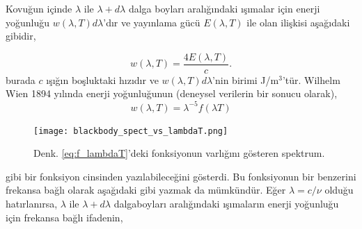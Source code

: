 \documentclass[a4paper,12pt, twoside]{article}
\begin{document}



Kovuğun içinde $\lambda$ ile $\lambda+d\lambda$ dalga boyları aralığındaki ışımalar için enerji yoğunluğu $w(\lambda,T) d\lambda$'dır ve yayınlama gücü $E(\lambda,T)$ ile olan ilişkisi aşağıdaki gibidir,
 
\begin{equation}
\label{eq:emissiveDensity}
w(\lambda,T) = \frac{4 E(\lambda,T)}{c}.
\end{equation}
burada $c$ ışığın boşluktaki hızıdır ve $w(\lambda,T)d\lambda$'nin birimi J/m$^3$'tür. Wilhelm Wien 1894 yılında enerji yoğunluğunun (deneysel verilerin bir sonucu olarak), 
\begin{equation}
\label{eq:f_lambdaT}
w(\lambda,T) = \lambda^{-5} f(\lambda T)
\end{equation}
\begin{figure}[hbtp]
\center
\texttt{[image: blackbody\_spect\_vs\_lambdaT.png]}
\caption{Denk. \ref{eq:f_lambdaT}'deki fonksiyonun varlığını gösteren spektrum.}
\label{fig:karaSpektrum_lamdaT}
\end{figure}
gibi bir fonksiyon cinsinden yazılabileceğini gösterdi. Bu fonksiyonun bir benzerini frekansa bağlı olarak aşağıdaki gibi yazmak da mümkündür. Eğer $\lambda = c/\nu$ olduğu hatırlanırsa, $\lambda$ ile $\lambda+d\lambda$ dalgaboyları aralığındaki 
ışımaların enerji yoğunluğu için frekansa bağlı ifadenin,
\end{document}
